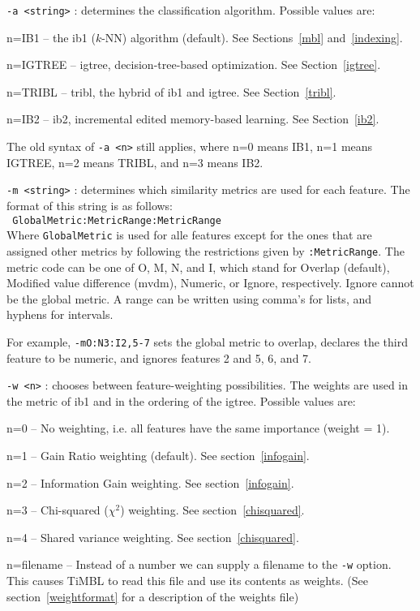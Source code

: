\documentclass{report}
\begin{document}
\begin{description}

\item {\tt -a <string>} : determines the classification algorithm. Possible
values are:

	\begin{description}
	\item n=IB1 -- the {\sc ib1} ($k$-NN) algorithm (default). See Sections~\ref{mbl} and~\ref{indexing}.
	\item n=IGTREE -- {\sc igtree}, decision-tree-based optimization. See Section~\ref{igtree}.
	\item n=TRIBL -- {\sc tribl}, the hybrid of {\sc ib1} and {\sc igtree}. See Section~\ref{tribl}.
	\item n=IB2 -- {\sc ib2}, incremental edited memory-based learning. See Section~\ref{ib2}.
	\end{description}

The old syntax of {\tt -a <n>} still applies, where n=0 means IB1, n=1
means IGTREE, n=2 means TRIBL, and n=3 means IB2.

\item {\tt -m <string>} : determines which similarity metrics are used
for each feature. The format of this string is as follows:\\ {\tt
GlobalMetric:MetricRange:MetricRange}\\ Where {\tt GlobalMetric} is
used for alle features except for the ones that are assigned other
metrics by following the restrictions given by {\tt :MetricRange}. The
metric code can be one of O, M, N, and I, which stand for Overlap
(default), Modified value difference ({\sc mvdm}), Numeric, or Ignore,
respectively. Ignore cannot be the global metric. A range
can be written using comma's for lists, and hyphens for intervals.

For example, {\tt -mO:N3:I2,5-7} sets the global metric to overlap,
declares the third feature to be numeric, and ignores features 2 and
5, 6, and 7.

\item {\tt -w <n>} : chooses between feature-weighting possibilities.
The weights are used in the metric of {\sc ib1} and in the ordering of the
{\sc igtree}. Possible values are:

	\begin{description}
	\item n=0 -- No weighting, i.e. all features have the same
	importance (weight = 1).
	\item n=1 -- Gain Ratio weighting (default). See section~\ref{infogain}.
	\item n=2 -- Information Gain weighting. See section~\ref{infogain}.
	\item n=3 -- Chi-squared ($\chi^2$) weighting. See section~\ref{chisquared}.
	\item n=4 -- Shared variance weighting. See section~\ref{chisquared}.
	\item n=filename -- Instead of a number we can supply a
	filename to the {\tt -w} option. This causes TiMBL to read this file
	and use its contents as weights. (See section~\ref{weightformat} for a
	description of the weights file)
	\end{description}


\end{description}
\end{document}
